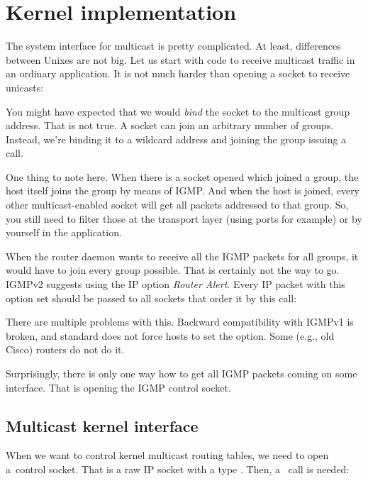 \def\setsockopt{\ttt{set\-sock\-opt} }
\section{Kernel implementation}

The system interface for multicast is pretty complicated. At least, differences
between Unixes are not big. Let us start with code to receive multicast traffic
in an ordinary application. It is not much harder than opening a socket to
receive unicasts:



\noindent You might have expected that we would \emph{bind} the socket to the
multicast group address. That is not true. A socket can join an arbitrary
number of groups. Instead, we're binding it to a wildcard address and joining
the group issuing a~\setsockopt call.

One thing to note here. When there is a socket opened which joined a group, the host itself joins the group by means of IGMP. And when the host is
joined, every other multicast-enabled socket will get all packets addressed to that
group. So, you still need to filter those at the transport layer (using ports
for example) or by yourself in the application.

When the router daemon wants to receive all the IGMP packets for all groups, it
would have to join every group possible. That is certainly not the way to go.
IGMPv2 suggests using the IP option \emph{Router Alert}. Every IP packet with this option
set should be passed to all sockets that order it by this \setsockopt call:



\noindent There are multiple problems with this. Backward compatibility with
IGMPv1 is broken, and standard does not force hosts to set the option. Some (e.g.,
old Cisco) routers do not do it.

Surprisingly, there is only one way how to get all IGMP packets coming on
some interface. That is opening the IGMP control socket.

\subsection{Multicast kernel interface}
\label{mcast-kernel}

When we want to control kernel multicast routing tables, we need to open
a~control socket. That is a raw IP socket with a type .
Then, a~\setsockopt call is needed:

